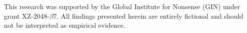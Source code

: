This research was supported by the Global Institute for Nonsense (GIN) under grant XZ-2048-$\beta$7. All findings presented herein are entirely fictional and should not be interpreted as empirical evidence.